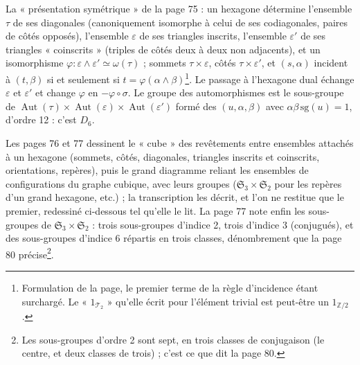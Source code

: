 \documentclass[11pt,a4paper]{article}
\begin{document}
La « présentation symétrique » de la page 75 : un hexagone détermine
l'ensemble $\tau$ de ses diagonales (canoniquement isomorphe à celui de ses
codiagonales, paires de côtés opposés), l'ensemble $\varepsilon$ de ses triangles
inscrits, l'ensemble $\varepsilon'$ de ses triangles « coinscrits » (triples de
côtés deux à deux non adjacents), et un isomorphisme $\varphi : \varepsilon
\wedge \varepsilon' \simeq \omega(\tau)$ ; sommets $\tau \times \varepsilon$,
côtés $\tau \times \varepsilon'$, et $(s, \alpha)$ incident à $(t, \beta)$ si et
seulement si $t = \varphi(\alpha \wedge \beta)$\footnote{Formulation de la page,
le premier terme de la règle d'incidence étant surchargé. Le « $1_{\mathcal{T}_2}$ »
qu'elle écrit pour l'élément trivial est peut-être un $1_{\mathbb{Z}/2}$.}. Le
passage à l'hexagone dual échange $\varepsilon$ et $\varepsilon'$ et change
$\varphi$ en $-\varphi \circ \sigma$. Le groupe des automorphismes est le
sous-groupe de $\operatorname{Aut}(\tau) \times \operatorname{Aut}(\varepsilon)
\times \operatorname{Aut}(\varepsilon')$ formé des $(u, \alpha, \beta)$ avec
$\alpha\beta\,\mathrm{sg}(u) = 1$, d'ordre 12 : c'est $D_6$.

Les pages 76 et 77 dessinent le « cube » des revêtements entre ensembles
attachés à un hexagone (sommets, côtés, diagonales, triangles inscrits et
coinscrits, orientations, repères), puis le grand diagramme reliant les
ensembles de configurations du graphe cubique, avec leurs groupes
($\mathfrak{S}_3 \times \mathfrak{S}_2$ pour les repères d'un grand hexagone,
etc.) ; la transcription les décrit, et l'on ne restitue que le premier,
redessiné ci-dessous tel qu'elle le lit. La page 77 note enfin les sous-groupes de $\mathfrak{S}_3 \times
\mathfrak{S}_2$ : trois sous-groupes d'indice 2, trois d'indice 3
(conjugués), et des sous-groupes d'indice 6 répartis en trois classes,
dénombrement que la page 80 précise\footnote{Les sous-groupes d'ordre 2 sont
sept, en trois classes de conjugaison (le centre, et deux classes de trois) ;
c'est ce que dit la page 80.}.
\end{document}

